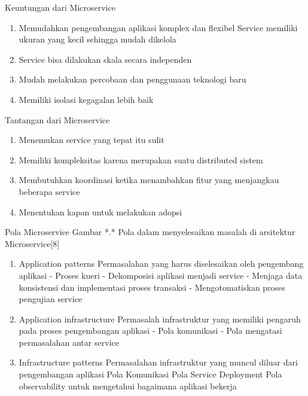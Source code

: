 Keuntungan dari Microservice
\begin{enumerate}[leftmargin=1.3cm]
	\item Memudahkan pengembangan aplikasi komplex dan flexibel Service memiliki ukuran yang kecil sehingga mudah dikelola
	\item Service bisa dilakukan skala secara independen 
	\item Mudah melakukan percobaan dan penggunaan teknologi baru
	\item Memiliki isolasi kegagalan lebih baik
\end{enumerate}	

Tantangan dari Microservice
\begin{enumerate}[leftmargin=1.3cm]
	\item Menemukan service yang tepat itu sulit
	\item Memiliki kompleksitas karena merupakan suatu distributed sistem
	\item Membutuhkan koordinasi ketika menambahkan fitur yang menjangkau beberapa service
	\item Menentukan kapan untuk melakukan adopsi
\end{enumerate}	

Pola Microservice
Gambar *.* Pola dalam menyelesaikan masalah di arsitektur Microservice[8]
\begin{enumerate}[leftmargin=1.3cm]
	\item Application patterns
	Permasalahan yang harus diselesaikan oleh pengembang aplikasi
	- Proses kueri
	- Dekomposisi aplikasi menjadi service
	- Menjaga data konsistensi dan implementasi proses transaksi
	- Mengotomatiskan proses pengujian  service
	\item Application infrastructure 
	Permasalah infrastruktur yang memiliki pengaruh pada proses pengembangan aplikasi
	- Pola komunikasi
	- Pola mengatasi permasalahan antar service
	\item Infrastructure patterns 
	Permasalahan infrastruktur yang muncul diluar dari pengembangan aplikasi
	Pola Komunikasi
	Pola Service Deployment
	Pola observability untuk mengetahui bagaimana aplikasi bekerja	
\end{enumerate}	

